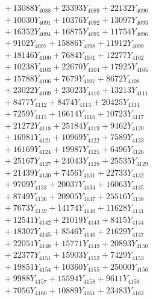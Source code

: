 \documentclass[a4paper,10pt]{article}
\begin{document}
{\begin{align}
&\;  + 13088 Y_{4088} + 23393 Y_{4089} + 22132 Y_{4090} \\[0.3ex]
&\;  + 10030 Y_{4091} + 10376 Y_{4092} + 13097 Y_{4093} \\[0.3ex]
&\;  + 16352 Y_{4094} + 16875 Y_{4095} + 11754 Y_{4096} \\[0.3ex]
&\;  + 9102 Y_{4097} + 15886 Y_{4098} + 11912 Y_{4099} \\[0.3ex]
&\;  + 18146 Y_{4100} + 7684 Y_{4101} + 12277 Y_{4102} \\[0.3ex]
&\;  + 10238 Y_{4103} + 22670 Y_{4104} + 17925 Y_{4105} \\[0.3ex]
&\;  + 15788 Y_{4106} + 7679 Y_{4107} + 8672 Y_{4108} \\[0.5ex]\allowbreak
&\;  + 23022 Y_{4109} + 23023 Y_{4110} + 13213 Y_{4111} \\[0.3ex]
&\;  + 8477 Y_{4112} + 8474 Y_{4113} + 20425 Y_{4114} \\[0.3ex]
&\;  + 7259 Y_{4115} + 16614 Y_{4116} + 10723 Y_{4117} \\[0.3ex]
&\;  + 21272 Y_{4118} + 25184 Y_{4119} + 9462 Y_{4120} \\[0.3ex]
&\;  + 16981 Y_{4121} + 10969 Y_{4122} + 7589 Y_{4123} \\[0.3ex]
&\;  + 16169 Y_{4124} + 19987 Y_{4125} + 6496 Y_{4126} \\[0.3ex]
&\;  + 25167 Y_{4127} + 24043 Y_{4128} + 25535 Y_{4129} \\[0.3ex]
&\;  + 21439 Y_{4130} + 7456 Y_{4131} + 22733 Y_{4132} \\[0.3ex]
&\;  + 9709 Y_{4133} + 20037 Y_{4134} + 16063 Y_{4135} \\[0.3ex]
&\;  + 8749 Y_{4136} + 20905 Y_{4137} + 25516 Y_{4138} \\[0.5ex]\allowbreak
&\;  + 7673 Y_{4139} + 14174 Y_{4140} + 11628 Y_{4141} \\[0.3ex]
&\;  + 12541 Y_{4142} + 21019 Y_{4143} + 8415 Y_{4144} \\[0.3ex]
&\;  + 18307 Y_{4145} + 8546 Y_{4146} + 21629 Y_{4147} \\[0.3ex]
&\;  + 22051 Y_{4148} + 15771 Y_{4149} + 20893 Y_{4150} \\[0.3ex]
&\;  + 22377 Y_{4151} + 15903 Y_{4152} + 7429 Y_{4153} \\[0.3ex]
&\;  + 19851 Y_{4154} + 10360 Y_{4155} + 25000 Y_{4156} \\[0.3ex]
&\;  + 9988 Y_{4157} + 15594 Y_{4158} + 9611 Y_{4159} \\[0.3ex]
&\;  + 7056 Y_{4160} + 10889 Y_{4161} + 23483 Y_{4162} \\[0.3ex]

\end{align}}
\end{document}
